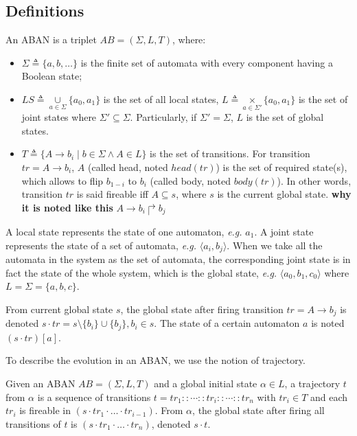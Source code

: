 \subsection{Definitions}
\begin{definition}[ABAN]\label{def:ABAN}
An ABAN is a triplet $AB = (\Sigma,L,T)$, where:
\begin{itemize}
\item $\Sigma\triangleq\{a,b,\ldots\}$ is the finite set of automata with every component having a Boolean state;
\item $LS\triangleq \underset{a\in \Sigma}{\cup} \{a_0,a_1\}$ is the set of all local states, $L\triangleq \underset{a\in \Sigma'}{\times} \{a_0,a_1\}$ is the set of joint states where $\Sigma'\subseteq\Sigma$. Particularly, if $\Sigma'=\Sigma$, $L$ is the set of global states. 
\item $T\triangleq \{A\rightarrow b_i\mid b\in \Sigma \land A\in L\}$ is the set of transitions.
For transition $tr=A\to b_i$, $A$ (called head, noted $head(tr)$) is the set of required state(s), which allows to flip $b_{1-i}$ to $b_i$ (called body, noted $body(tr)$). In other words, transition $tr$ is said fireable iff $A\subseteq s$, where $s$ is the current global state. \textbf{why it is noted like this} $A\rightarrow b_i\Rsh b_j$
\end{itemize}
\end{definition}

A local state represents the state of one automaton, \textit{e.g.} $a_1$.
A joint state represents the state of a set of automata, \textit{e.g.} $\langle a_i, b_j\rangle$.
When we take all the automata in the system as the set of automata, the corresponding joint state is in fact the state of the whole system, which is the global state, \textit{e.g.} $\langle a_0, b_1,c_0 \rangle$ where $L=\Sigma =\{a,b,c\}$.

\begin{definition}[Dynamics]
    From current global state $s$, the global state after firing transition $tr=A\to b_j$ is denoted $s \cdot tr = s \setminus \{b_i\} \cup \{b_j\}, b_i \in s$.
    The state of a certain automaton $a$ is noted $(s\cdot tr)[a]$.
\end{definition}

To describe the evolution in an ABAN, we use the notion of trajectory.

\begin{definition}[Trajectory]
Given an ABAN $AB = (\Sigma,L,T)$ and a global initial state $\alpha\in L$, a trajectory $t$ from $\alpha$ is a sequence of transitions $t=tr_1::\cdots :: tr_i::\cdots ::tr_n$ with $tr_i\in T$ and each $tr_i$ is fireable in $(s \cdot tr_1 \cdot \ldots \cdot tr_{i-1})$.
From $\alpha$, the global state after firing all transitions of $t$ is $(s \cdot tr_1 \cdot \ldots \cdot tr_n)$, denoted $s \cdot t$.
\end{definition}

